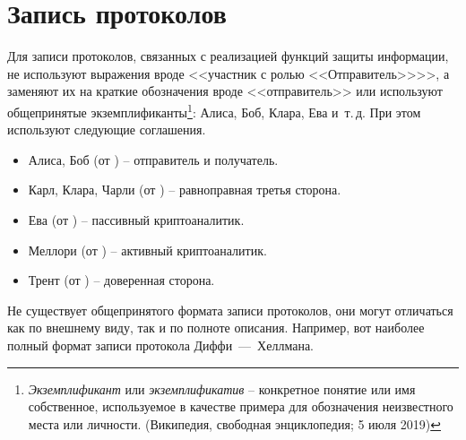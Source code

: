 \section{Запись протоколов}
Для записи протоколов, связанных с реализацией функций защиты информации, не используют выражения вроде <<участник с ролью <<Отправитель>>>>, а заменяют их на краткие обозначения вроде <<отправитель>> или используют общепринятые экземплификанты\footnote{\emph{Экземплификант} или \emph{экземплификатив} -- конкретное понятие или имя собственное, используемое в качестве примера для обозначения неизвестного места или личности. (Википедия, свободная энциклопедия; 5 июля 2019)}: Алиса, Боб, Клара, Ева и~т.\,д. При этом используют следующие соглашения.

\begin{itemize}
	\item Алиса, Боб (от ) -- отправитель и получатель.
	\item Карл, Клара, Чарли (от ) -- равноправная третья сторона.
	\item Ева (от ) -- пассивный криптоаналитик.
	\item Меллори (от ) -- активный криптоаналитик.
	\item Трент (от ) -- доверенная сторона.
\end{itemize}

Не существует общепринятого формата записи протоколов, они могут отличаться как по внешнему виду, так и по полноте описания. Например, вот наиболее полный формат записи протокола Диффи~---~Хеллмана.

